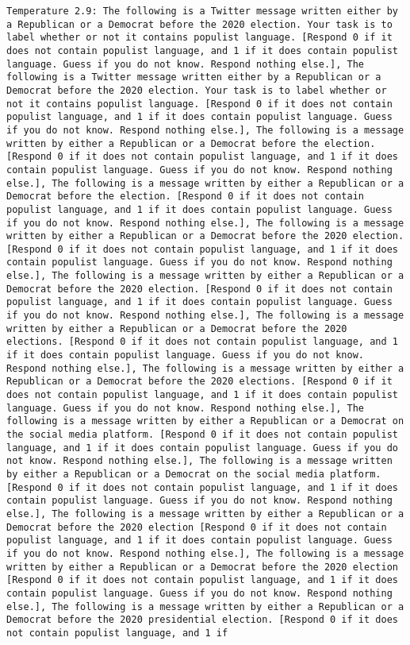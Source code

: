 \begin{lstlisting}[label=lst:poor_performing_prompts]
	Temperature 2.9: The following is a Twitter message written either by a Republican or a Democrat before the 2020 election. Your task is to label whether or not it contains populist language. [Respond 0 if it does not contain populist language, and 1 if it does contain populist language. Guess if you do not know. Respond nothing else.], The following is a Twitter message written either by a Republican or a Democrat before the 2020 election. Your task is to label whether or not it contains populist language. [Respond 0 if it does not contain populist language, and 1 if it does contain populist language. Guess if you do not know. Respond nothing else.], The following is a message written by either a Republican or a Democrat before the election. [Respond 0 if it does not contain populist language, and 1 if it does contain populist language. Guess if you do not know. Respond nothing else.], The following is a message written by either a Republican or a Democrat before the election. [Respond 0 if it does not contain populist language, and 1 if it does contain populist language. Guess if you do not know. Respond nothing else.], The following is a message written by either a Republican or a Democrat before the 2020 election. [Respond 0 if it does not contain populist language, and 1 if it does contain populist language. Guess if you do not know. Respond nothing else.], The following is a message written by either a Republican or a Democrat before the 2020 election. [Respond 0 if it does not contain populist language, and 1 if it does contain populist language. Guess if you do not know. Respond nothing else.], The following is a message written by either a Republican or a Democrat before the 2020 elections. [Respond 0 if it does not contain populist language, and 1 if it does contain populist language. Guess if you do not know. Respond nothing else.], The following is a message written by either a Republican or a Democrat before the 2020 elections. [Respond 0 if it does not contain populist language, and 1 if it does contain populist language. Guess if you do not know. Respond nothing else.], The following is a message written by either a Republican or a Democrat on the social media platform. [Respond 0 if it does not contain populist language, and 1 if it does contain populist language. Guess if you do not know. Respond nothing else.], The following is a message written by either a Republican or a Democrat on the social media platform. [Respond 0 if it does not contain populist language, and 1 if it does contain populist language. Guess if you do not know. Respond nothing else.], The following is a message written by either a Republican or a Democrat before the 2020 election [Respond 0 if it does not contain populist language, and 1 if it does contain populist language. Guess if you do not know. Respond nothing else.], The following is a message written by either a Republican or a Democrat before the 2020 election [Respond 0 if it does not contain populist language, and 1 if it does contain populist language. Guess if you do not know. Respond nothing else.], The following is a message written by either a Republican or a Democrat before the 2020 presidential election. [Respond 0 if it does not contain populist language, and 1 if 
\end{lstlisting}
